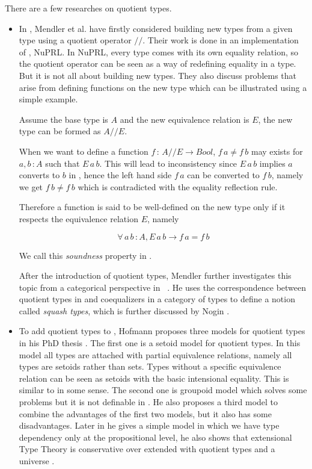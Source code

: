There are a few researches on quotient types.


\begin{itemize}

\item In \cite{cab}, Mendler et al. have firstly considered building new types from a
given type using a quotient operator $//$. Their work is done in an
implementation of \ett, NuPRL. 
In NuPRL, every type comes with its own equality relation, so the quotient operator can be
seen as a way of redefining equality in a type. But it is not all
about building new types. They also discuss problems that arise from
defining functions on the new type which can be illustrated using a simple example. 

Assume the base type is $A$ and the new equivalence relation is $E$, the new
type can be formed as $A//E$. 

When we want to define a function $f \,\colon\, A//E \to Bool$,  $f\,a \not= f\,b$ may
exists for $a, b \,\colon A$ such that $E\,a\,b$. This will lead to
inconsistency since $E\,a\,b$ implies $a$ converts to $b$ in \ett{}, hence
the left hand side $f\,a$ can be converted to $f\,b$, namely we get $f\,b \not= f\,b$
which is contradicted with the equality reflection rule. 

Therefore a function is said to be well-defined \cite{cab} on the new type only
if it respects the equivalence relation $E$, namely

$$\forall \, a\,b\,\colon A, E\,a\,b \to f\,a = f\,b$$

We call this \emph{soundness} property in \cite{aan}.

 After the introduction of quotient types, Mendler further investigates
 this topic from a categorical perspective in ~\cite{men:90}. He uses
 the correspondence between quotient types in \mltt{} and coequalizers
 in a category of types to define a notion called \emph{squash types},
 which is further discussed by Nogin \cite{nog:02}.

\item To add quotient types to \mltt{}, Hofmann proposes  three models for
quotient types in his PhD thesis \cite{hof:phd}. The first one is a setoid model for
quotient types. In this model all types are attached with partial
equivalence relations, namely all types are setoids rather than
sets. Types without a specific equivalence relation can be seen as
setoids with the basic intensional equality. This is similar to
\ett{} in some sense. The second one is groupoid model which solves some problems
but it is not definable in \itt{}. He also proposes a third model to
combine the advantages of the first two models, but it also has some
disadvantages. Later in \cite{hof:95:sm} he gives a simple model in which we have type dependency only at the propositional level, he also shows that extensional Type Theory is conservative over \itt  extended with quotient types and a universe \cite{hof:95:con}.


\end{itemize}
